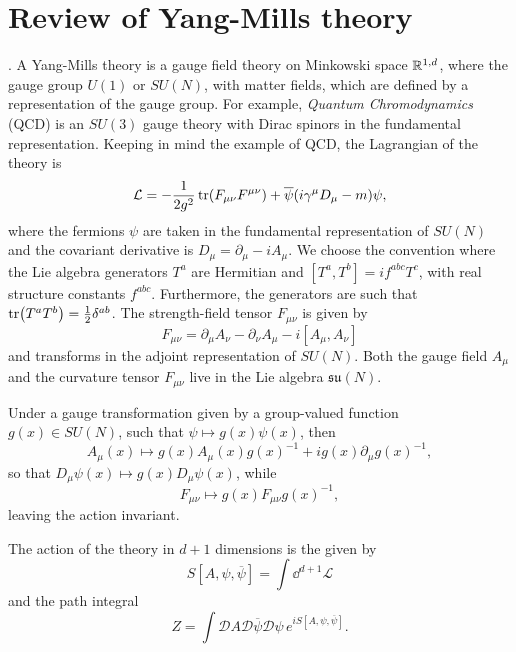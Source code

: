 \section{Review of Yang-Mills theory}
\label{sec:yang_mills_theory}

.
A Yang-Mills theory is a gauge field theory on Minkowski space $\mathbb{R}^{1,d}$, where the gauge group $U(1)$ or $SU(N)$, with matter fields, which are defined by a representation of the gauge group.
For example, \emph{Quantum Chromodynamics} (QCD) is an $SU(3)$ gauge theory with Dirac spinors in the fundamental representation.
Keeping in mind the example of QCD, the Lagrangian of the theory is
\begin{equation}
    \mathcal{L} = - \frac{1}{2 g^2} \tr(F_{\mu \nu} F^{\mu \nu}) + \overline{\psi} \qty( i \gamma^{\mu} D_{\mu} - m ) \psi,
\end{equation}
where the fermions $\psi$ are taken in the fundamental representation of $SU(N)$ and the covariant derivative is $D_{\mu} = \partial_{\mu} - i A_{\mu}$.
We choose the convention where the Lie algebra generators $T^a$ are Hermitian and $[T^a, T^b] = i f^{abc} T^c$, with real structure constants $f^{abc}$.
Furthermore, the generators are such that $\tr(T^a T^b) = \frac{1}{2} \delta^{ab}$.
The strength-field tensor $F_{\mu \nu}$ is given by
\begin{equation}
    F_{\mu \nu} = \partial_{\mu} A_{\nu} - \partial_{\nu} A_{\mu} - i [A_{\mu}, A_{\nu}]
\end{equation}
and transforms in the adjoint representation of $SU(N)$.
Both the gauge field $A_{\mu}$ and the curvature tensor $F_{\mu \nu}$ live in the Lie algebra $\mathfrak{su}(N)$.

Under a gauge transformation given by a group-valued function $g(x) \in SU(N)$, such that $\psi \mapsto g(x) \psi(x)$, then
\begin{equation}
    A_{\mu}(x) \mapsto g(x) A_{\mu}(x) g(x)^{-1} + i g(x) \partial_{\mu} g(x)^{-1},
\end{equation}
so that $D_{\mu} \psi(x) \mapsto g(x) D_{\mu} \psi(x)$, while
\begin{equation}
    F_{\mu \nu} \mapsto g(x) F_{\mu \nu} g(x)^{-1},
\end{equation}
leaving the action invariant.

The action of the theory in $d+1$ dimensions is the given by
\begin{equation}
    S[A, \psi, \overline{\psi}] = \int \dd^{d+1} \mathcal{L}
\end{equation}
and the path integral
\begin{equation}
    Z = \int \mathcal{D} A \mathcal{D} \overline{\psi} \mathcal{D} \psi \, e^{i S[A, \psi, \overline{\psi}]}.
\end{equation}



